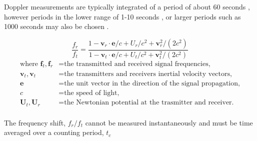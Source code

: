Doppler measurements are typically integrated of a period of about 60 seconds
\cite{}, however periods in the lower range of 1-10 seconds \cite{}, or larger
periods such as 1000 seconds may also be chosen \cite{}.


\cite{Soffel1989}

\begin{equation}
    \frac{f_r}{f_t} = \frac{
        1-\mathbf{v}_r\cdot{}\mathbf{e}/c + U_r/c^2 +\mathbf{v}_r^2/(2c^2)
    }{
        1-\mathbf{v}_t\cdot{}\mathbf{e}/c + U_t/c^2 +\mathbf{v}_t^2/(2c^2)
    }
\end{equation}
\begin{equation*}
    \begin{aligned}
        \textrm{where  }
        \mathbf{f}_t, \mathbf{f}_r &= \textrm{the transmitted and received signal frequencies,}\\
        \mathbf{v}_t, \mathbf{v}_t &= \textrm{the transmitters and receivers inertial velocity vectors,}\\
        \mathbf{e} &= \textrm{the unit vector in the direction of the signal propagation,}\\
        c &= \textrm{the speed of light,}\\
        \mathbf{U}_t, \mathbf{U}_r &= \textrm{the Newtonian potential at the trasmitter and receiver.}\\
    \end{aligned}
\end{equation*}

The frequency shift, $f_r/f_t$ cannot be measured instantaneously and must be
time averaged over a counting period, $t_c$



